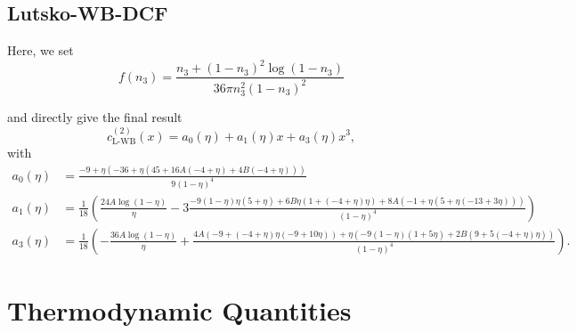 \documentclass{article}
\begin{document}
\subsection{Lutsko-WB-DCF}

Here, we set
\begin{equation}
	f(n_3) = \frac{n_3+(1-n_3)^2\log(1-n_3)}{36\pi n_3^2(1-n_3)^2}
\end{equation}

and directly give the final result
\begin{equation}
	c^{(2)}_{\text{L-WB}}(x) = a_0(\eta) + a_1(\eta)x + a_3(\eta)x^3,
\end{equation}
with
\begin{align}
	a_0(\eta) &= \frac{-9+\eta(-36+\eta(45+16A(-4+\eta)+4B(-4+\eta)))}{9(1-\eta)^4}\\\nonumber
	a_1(\eta) &= \frac{1}{18}\left(\frac{24A\log(1-\eta)}{\eta}-3\frac{-9(1-\eta)\eta(5+\eta)+6B\eta(1+(-4+\eta)\eta)+8A(-1+\eta(5+\eta(-13+3\eta)))}{(1-\eta)^4}\right)\\\nonumber
	a_3(\eta) &= \frac{1}{18}\left(-\frac{36A\log(1-\eta)}{\eta}+\frac{4A(-9+(-4+\eta)\eta(-9+10\eta))+\eta(-9(1-\eta)(1+5\eta)+2B(9+5(-4+\eta)\eta))}{(1-\eta)^4}\right).
\end{align}

\section{Thermodynamic Quantities}
\end{document}
